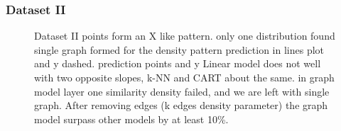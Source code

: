 \documentclass[a4paper]{article}
\begin{document}
\subsubsection{Dataset II}
\begin{figure}[H]
\centering
{}
 \centering
{}





\caption[Optional caption for list of figures]{
 Dataset II points form an X like pattern.
only one distribution found
 single graph formed for the density pattern
 prediction in lines plot and y dashed.
 prediction points and y
Linear model does not well with two opposite slopes, k-NN and CART about the same.
in graph model layer one similarity density failed, and we are left with single graph.  After removing edges (k edges density parameter) the graph model surpass other models by at least 10\%.
}
 \label{fig:subfigureExample}

\end{figure}
\end{document}
